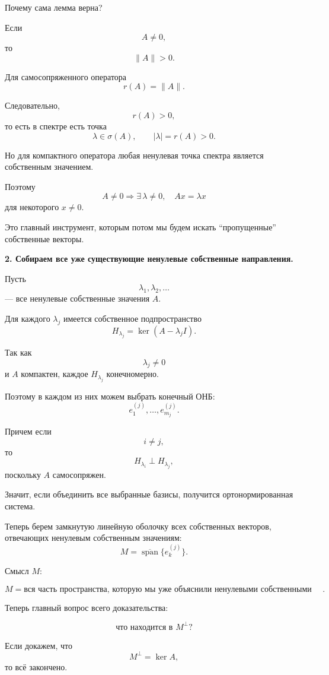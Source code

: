 \begin{idea}
	Почему сама лемма верна?
	
	Если
	\[
	A\neq0,
	\]
	то
	\[
	\|A\|>0.
	\]
	
	Для самосопряженного оператора
	\[
	r(A)=\|A\|.
	\]
	
	Следовательно,
	\[
	r(A)>0,
	\]
	то есть в спектре есть точка
	\[
	\lambda\in\sigma(A),
	\qquad
	|\lambda|=r(A)>0.
	\]
	
	Но для компактного оператора любая ненулевая точка спектра является
	собственным значением.
	
	Поэтому
	\[
	\boxed{
		A\neq0
		\Longrightarrow
		\exists\,\lambda\neq0,\quad
		Ax=\lambda x
	}
	\]
	для некоторого \(x\neq0\).
	
	Это главный инструмент, которым потом мы будем искать
	``пропущенные'' собственные векторы.
	
	\medskip
	
	\textbf{2. Собираем все уже существующие ненулевые собственные направления.}
	
	Пусть
	\[
	\lambda_1,\lambda_2,\ldots
	\]
	--- все ненулевые собственные значения \(A\).
	
	Для каждого \(\lambda_j\) имеется собственное подпространство
	\[
	H_{\lambda_j}
	=
	\ker(A-\lambda_jI).
	\]
	
	Так как
	\[
	\lambda_j\neq0
	\]
	и \(A\) компактен, каждое \(H_{\lambda_j}\) конечномерно.
	
	Поэтому в каждом из них можем выбрать конечный ОНБ:
	\[
	e_1^{(j)},\ldots,e_{m_j}^{(j)}.
	\]
	
	Причем если
	\[
	i\neq j,
	\]
	то
	\[
	H_{\lambda_i}\perp H_{\lambda_j},
	\]
	поскольку \(A\) самосопряжен.
	
	Значит, если объединить все выбранные базисы, получится
	ортонормированная система.
	
	\medskip
	
	Теперь берем замкнутую линейную оболочку всех собственных векторов,
	отвечающих ненулевым собственным значениям:
	\[
	M=
	\overline{\operatorname{span}}
	\{e_k^{(j)}\}.
	\]
	
	Смысл \(M\):
	
	\[
	\boxed{
		M=
		\text{вся часть пространства, которую мы уже объяснили
			ненулевыми собственными векторами}.
	}
	\]
	
	Теперь главный вопрос всего доказательства:
	
	\[
	\boxed{
		\text{что находится в }M^\perp?
	}
	\]
	
	Если докажем, что
	\[
	M^\perp=\ker A,
	\]
	то всё закончено.
	

\end{idea}

